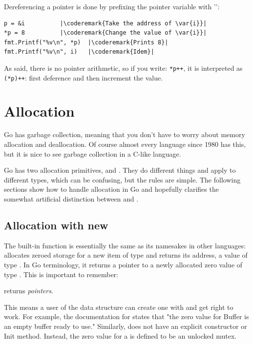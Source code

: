 Dereferencing a pointer is done by prefixing the pointer variable with
'\type{*}':
\begin{lstlisting}[caption=Dereferencing a pointer,label=src:deref]
p = &i			|\coderemark{Take the address of \var{i}}|
*p = 8			|\coderemark{Change the value of \var{i}}|
fmt.Printf("%v\n", *p)  |\coderemark{Prints 8}|
fmt.Printf("%v\n", i)	|\coderemark{Idem}|
\end{lstlisting}

As said, there is no pointer arithmetic, so if you write:
\lstinline{*p++}, it is interpreted as \lstinline{(*p)++}: first
deference and then increment the value.


\section{Allocation}
Go has garbage collection, meaning that you don't have to worry about
memory allocation and deallocation. Of course almost every language
since 1980 has this, but it is nice to see garbage collection in a
C-like language.

Go has two allocation primitives,  and . They do different
things and apply to different types, which can be confusing, but the
rules are simple.
The following sections show how to handle allocation
in Go and hopefully clarifies the somewhat artificial distinction between
 and . 

\subsection{Allocation with new}
\label{sec:allocation with new}
The built-in function  is 
essentially the same as its namesakes in other languages: 
allocates zeroed storage for a new item of type  and returns its
address, a value of type . In Go terminology, it returns a pointer to
a newly allocated zero value of type . This is important to
remember:
\begin{lbar}
 returns \emph{pointers}.
\end{lbar}

This
means a user of the data structure can create one with  and get
right to work. For example, the documentation for  states
that "the zero value for Buffer is an empty buffer ready to use."
Similarly,  does not have an explicit constructor or Init
method. Instead, the zero value for a  is defined to be an
unlocked mutex.

